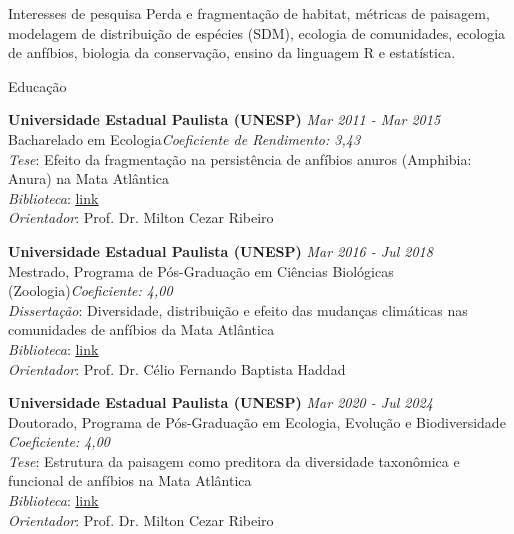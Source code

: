 \documentclass{resume}
\begin{document}

\begin{rSection}{Interesses de pesquisa}
Perda e fragmentação de habitat, métricas de paisagem, modelagem de distribuição de espécies (SDM), ecologia de comunidades, ecologia de anfíbios, biologia da conservação, ensino da linguagem R e estatística.
\end{rSection}


\begin{rSection}{Educação}

{\bf Universidade Estadual Paulista (UNESP)} \hfill {\em Mar 2011 - Mar 2015}\\
Bacharelado em Ecologia\hfill {\em Coeficiente de Rendimento: 3,43}\\
{\it Tese}: Efeito da fragmentação na persistência de anfíbios anuros (Amphibia: Anura) na Mata Atlântica\\
{\it Biblioteca}: \href{http://hdl.handle.net/11449/138991}{\underline{link}}\\
{\it Orientador}: Prof. Dr. Milton Cezar Ribeiro

{\bf Universidade Estadual Paulista (UNESP)} \hfill {\em Mar 2016 - Jul 2018}\\
Mestrado, Programa de Pós-Graduação em Ciências Biológicas (Zoologia)\hfill {\em Coeficiente: 4,00}\\
{\it Dissertação}: Diversidade, distribuição e efeito das mudanças climáticas nas comunidades de anfíbios da Mata Atlântica\\
{\it Biblioteca}: \href{http://hdl.handle.net/11449/154993}{\underline{link}}\\
{\it Orientador}: Prof. Dr. Célio Fernando Baptista Haddad

{\bf Universidade Estadual Paulista (UNESP)} \hfill {\em Mar 2020 - Jul 2024}\\
Doutorado, Programa de Pós-Graduação em Ecologia, Evolução e Biodiversidade \hfill {\em Coeficiente: 4,00}\\
{\it Tese}: Estrutura da paisagem como preditora da diversidade taxonômica e funcional de anfíbios na Mata Atlântica\\
{\it Biblioteca}: \href{https://hdl.handle.net/11449/256726}{\underline{link}}\\
{\it Orientador}: Prof. Dr. Milton Cezar Ribeiro

\end{rSection}
\end{document}
